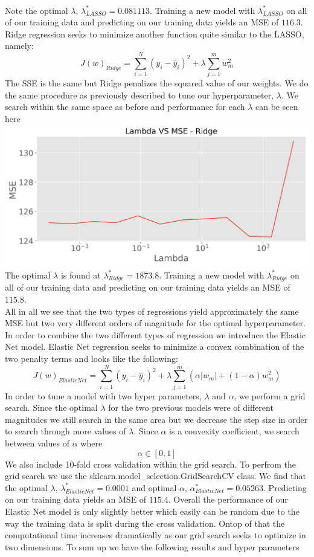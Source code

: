 \documentclass[12pt,a4paper]{article}
\begin{document}
\\
Note the optimal $\lambda$, $\lambda^*_{LASSO} = 0.081113$. Training a new model with $\lambda^*_{LASSO}$ on all of our training data and predicting on our training data yields an MSE of $116.3$. \\
Ridge regression seeks to minimize another function quite similar to the LASSO, namely:
$$J(w)_{Ridge} = \sum_{i = 1}^{N}(y_i - \hat{y}_i)^2 + \lambda \sum_{j=1}^{m}w_m^2$$
The SSE is the same but Ridge penalizes the squared value of our weights. We do the same procedure as previously described to tune our hyperparameter, $\lambda$. We search within the same space as before and performance for each $\lambda$ can be seen here\\
\includegraphics[scale = 0.7]{Ridge_MSE.png}
\\
The optimal $\lambda$ is found at $\lambda^*_{Ridge} = 1873.8$. Training a new model with $\lambda^*_{Ridge}$ on all of our training data and predicting on our training data yields an MSE of $115.8$.\\
All in all we see that the two types of regressions yield approximately the same MSE but two very different orders of magnitude for the optimal hyperparameter. In order to combine the two different types of regression we introduce the Elastic Net model. Elastic Net regression seeks to minimize a convex combination of the two penalty terms and looks like the following:
$$J(w)_{Elastic Net} = \sum_{i = 1}^{N}(y_i - \hat{y}_i)^2 + \lambda \sum_{j=1}^{m}(\alpha|w_m| + (1-\alpha)w_m^2)$$
In order to tune a model with two hyper parameters, $\lambda$ and $\alpha$, we perform a grid search. Since the optimal $\lambda$ for the two previous models were of different magnitudes we still search in the same area but we decrease the step size in order to search through more values of $\lambda$. Since $\alpha$ is a convexity coefficient, we search between values of $\alpha$ where
$$\alpha \in [0,1]$$
We also include 10-fold cross validation within the grid search. To perfrom the grid search we use the sklearn.model\_selection.GridSearchCV class. We find that the optimal $\lambda$, $\lambda^*_{Elastic Net} = 0.0001$ and optimal $\alpha$, $\alpha^*_{Elastic Net} = 0.05263$. Predicting on our training data yields an MSE of $115.4$. Overall the performance of our Elastic Net model is only slightly better which easily can be random due to the way the training data is split during the cross validation. Ontop of that the computational time increases dramatically as our grid search seeks to optimize in two dimensions. To sum up we have the following results and hyper parameters\\
\end{document}
